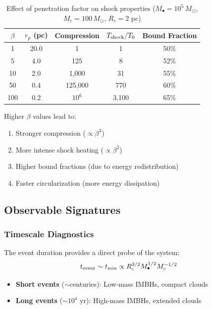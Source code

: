 \documentclass[twocolumn,amsmath,amssymb,prd,superscriptaddress,nofootinbib]{revtex4-2}
\begin{document}
\begin{table}[h]
\centering
\caption{Effect of penetration factor on shock properties ($M_\bullet = 10^5\,M_\odot$, $M_c = 100\,M_\odot$, $R_c = 2$ pc)}
\label{tab:beta_survey}
\begin{tabular}{ccccc}
\toprule
$\beta$ & $r_p$ (pc) & Compression & $T_{\rm shock}/T_0$ & Bound Fraction \\
\midrule
1 & 20.0 & 1 & 1 & 50\% \\
5 & 4.0 & 125 & 8 & 52\% \\
10 & 2.0 & 1,000 & 31 & 55\% \\
50 & 0.4 & 125,000 & 770 & 60\% \\
100 & 0.2 & $10^6$ & 3,100 & 65\% \\
\bottomrule
\end{tabular}
\end{table}

Higher $\beta$ values lead to:
\begin{enumerate}
    \item Stronger compression ($\propto \beta^3$)
    \item More intense shock heating ($\propto \beta^2$)
    \item Higher bound fractions (due to energy redistribution)
    \item Faster circularization (more energy dissipation)
\end{enumerate}

\subsection{Observable Signatures}
\label{sec:observables}

\subsubsection{Timescale Diagnostics}

The event duration provides a direct probe of the system:
\begin{equation}
    t_{\rm event} \sim t_{\rm min} \propto R_c^{3/2} M_\bullet^{1/2} M_c^{-1/2}
\end{equation}

\begin{itemize}
    \item \textbf{Short events} ($\sim$centuries): Low-mass IMBHs, compact clouds
    \item \textbf{Long events} ($\sim 10^4$ yr): High-mass IMBHs, extended clouds
\end{itemize}
\end{document}
